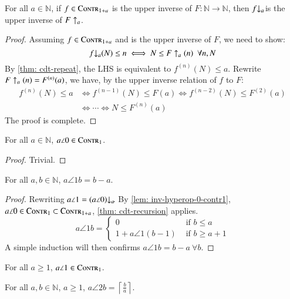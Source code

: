 \begin{thm} \label{thm: upp-inv-cdt-rf}
For all $a\in \mathbb{N}$, if $f\in \text{\scshape{Contr}}_{1+a}$ is the upper inverse of $F: \mathbb{N}\to \mathbb{N}$, then $\cdt{f}{a}$ is the upper inverse of $F\uparrow_{a}$.
\end{thm}
\begin{proof}
Assuming $f\in \text{\scshape{Contr}}_{1+a}$ and is the upper inverse of $F$, we need to show:
$$ \cdt{f}{a}(N) \le n \iff N \le \rf{F}{a}(n) \ \ \forall n, N $$
By \cref{thm: cdt-repeat}, the LHS is equivalent to $f^{(n)}(N)\le a$. Rewrite $F\uparrow_{a}(n) = F^{(n)}(a)$, we have, by the upper inverse relation of $f$ to $F$:
$$ \begin{aligned}
f^{(n)}(N) \le a & \iff f^{(n-1)}(N) \le F(a) \iff f^{(n-2)}(N) \le F^{(2)}(a) \\
 & \iff \cdots \iff N \le F^{(n)}(a) 
\end{aligned}$$
The proof is complete.
\end{proof}

\begin{lem}  \label{lem: inv-hyperop-0-contr1}
For all $a\in \mathbb{N}$, $a\angle{0}\in \text{\scshape{Contr}}_1$.
\end{lem}
\begin{proof}
Trivial.
\end{proof}

\begin{thm}
For all $a, b\in \mathbb{N}$, $a\angle{1}b = b - a$.
\end{thm}
\begin{proof}
Rewriting $a\angle{1} = \cdt{\left(a\angle{0}\right)}{a}$. By \cref{lem: inv-hyperop-0-contr1}, $a\angle{0} \in \text{\scshape{Contr}}_1 \subset \text{\scshape{Contr}}_{1+a}$, \cref{thm: cdt-recursion} applies.
$$ a\angle{1}b = \begin{cases}
0 & \text{ if } b\le a \\ 1 + a\angle{1}(b - 1) & \text{ if } b\ge a+1
\end{cases} $$
A simple induction will then confirms $a\angle{1}b = b - a \ \forall b$.
\end{proof}

\begin{col} \label{col: inv-hyperop-1-contr1}
For all $a\ge 1$, $a\angle{1} \in \text{\scshape{Contr}}_1$.
\end{col}

\begin{col}
For all $a, b\in \mathbb{N}$, $a\ge 1$, $a\angle{2}b = \displaystyle \left\lceil \frac{b}{a} \right\rceil$.
\end{col}

